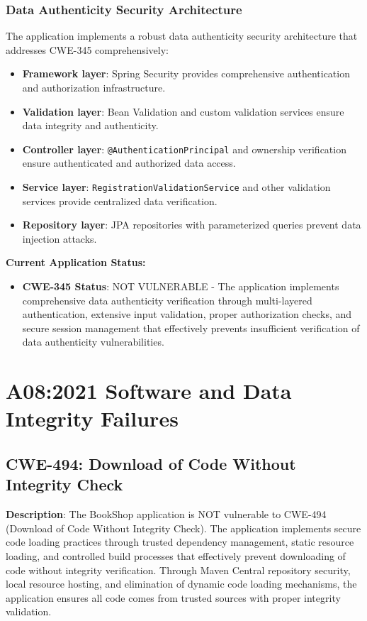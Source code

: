 \documentclass[]{UCD_CS_FYP_Report}
\begin{document}
\subsection{Data Authenticity Security Architecture}
The application implements a robust data authenticity security architecture that addresses CWE-345 comprehensively:
\begin{itemize}
	\item \textbf{Framework layer}: Spring Security provides comprehensive authentication and authorization infrastructure.
	\item \textbf{Validation layer}: Bean Validation and custom validation services ensure data integrity and authenticity.
	\item \textbf{Controller layer}: \texttt{@AuthenticationPrincipal} and ownership verification ensure authenticated and authorized data access.
	\item \textbf{Service layer}: \texttt{RegistrationValidationService} and other validation services provide centralized data verification.
	\item \textbf{Repository layer}: JPA repositories with parameterized queries prevent data injection attacks.
\end{itemize}

\textbf{Current Application Status:}
\begin{itemize}
	\item \textbf{CWE-345 Status}: NOT VULNERABLE - The application implements comprehensive data authenticity verification through multi-layered authentication, extensive input validation, proper authorization checks, and secure session management that effectively prevents insufficient verification of data authenticity vulnerabilities.
\end{itemize}


\chapter{A08:2021 Software and Data Integrity Failures}

\section{CWE-494: Download of Code Without Integrity Check}

\textbf{Description}: The BookShop application is NOT vulnerable to CWE-494 (Download of Code Without Integrity Check). The application implements secure code loading practices through trusted dependency management, static resource loading, and controlled build processes that effectively prevent downloading of code without integrity verification. Through Maven Central repository security, local resource hosting, and elimination of dynamic code loading mechanisms, the application ensures all code comes from trusted sources with proper integrity validation.
\end{document}
